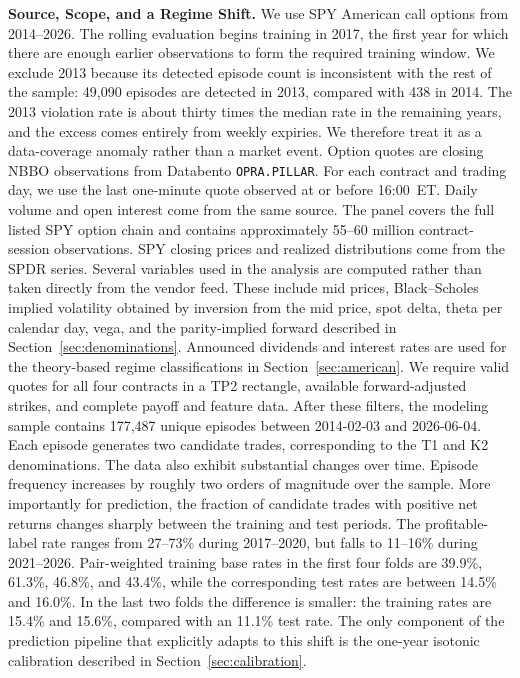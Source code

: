 \documentclass[sigconf,review,anonymous]{acmart}
\begin{document}
\smallskip\noindent\textbf{Source, Scope, and a Regime Shift.}
\label{sec:data-source}
We use SPY American call options from 2014--2026. The rolling evaluation begins training in 2017, the first year for which there are enough earlier observations to form the required training window. We exclude 2013 because its detected episode count is inconsistent with the rest of the sample: 49{,}090 episodes are detected in 2013, compared with 438 in 2014. The 2013 violation rate is about thirty times the median rate in the remaining years, and the excess comes entirely from weekly expiries. We therefore treat it as a data-coverage anomaly rather than a market event.
Option quotes are closing NBBO observations from Databento \texttt{OPRA.PILLAR}. For each contract and trading day, we use the last one-minute quote observed at or before 16:00~ET. Daily volume and open interest come from the same source. The panel covers the full listed SPY option chain and contains approximately 55--60 million contract-session observations. SPY closing prices and realized distributions come from the SPDR series.
Several variables used in the analysis are computed rather than taken directly from the vendor feed. These include mid prices, Black--Scholes implied volatility obtained by inversion from the mid price, spot delta, theta per calendar day, vega, and the parity-implied forward described in Section~\ref{sec:denominations}. Announced dividends and interest rates are used for the theory-based regime classifications in Section~\ref{sec:american}.
We require valid quotes for all four contracts in a TP2 rectangle, available forward-adjusted strikes, and complete payoff and feature data. After these filters, the modeling sample contains 177{,}487 unique episodes between 2014-02-03 and 2026-06-04. Each episode generates two candidate trades, corresponding to the T1 and K2 denominations.
The data also exhibit substantial changes over time. Episode frequency increases by roughly two orders of magnitude over the sample. More importantly for prediction, the fraction of candidate trades with positive net returns changes sharply between the training and test periods. The profitable-label rate ranges from 27--73\% during 2017--2020, but falls to 11--16\% during 2021--2026. Pair-weighted training base rates in the first four folds are 39.9\%, 61.3\%, 46.8\%, and 43.4\%, while the corresponding test rates are between 14.5\% and 16.0\%. In the last two folds the difference is smaller: the training rates are 15.4\% and 15.6\%, compared with an 11.1\% test rate. The only component of the prediction pipeline that explicitly adapts to this shift is the one-year isotonic calibration described in Section~\ref{sec:calibration}.
\end{document}
